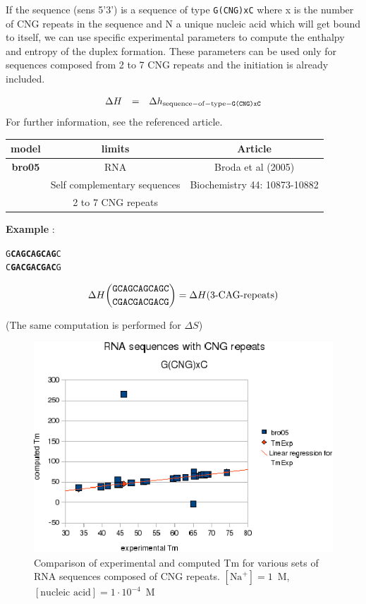 \documentclass{article}
\begin{document}
If the sequence (sens 5'3') is a sequence of type \texttt{G(CNG)xC} where x is the number of CNG repeats in
the sequence and N a unique nucleic acid which will get bound to itself, we can use specific
experimental parameters to compute the enthalpy and entropy of the duplex formation. These parameters can be used
only for sequences composed from 2 to 7 CNG repeats and the initiation is already included.
 
\begin{displaymath}
  \begin{array}[t]{ccc}
  \Delta{}H&=&\Delta{}h_\mathrm{sequence-of-type-\texttt{G(CNG)xC}}\\
  \end{array}
\end{displaymath}
For further information, see the referenced article.

\begin{table}[hc]
\begin{tabular}[h]{| c | c | c |}
\textbf{model} & \textbf{limits} & \textbf{Article} \\
 \hline
\textbf{bro05} & RNA & Broda et al (2005) \\
 & Self complementary sequences & Biochemistry 44: 10873-10882\\
 & 2 to 7 CNG repeats & \\
 \hline
\end{tabular}
\end{table}


\textbf{Example} :
\begin{alltt}
G\textbf{CAGCAGCAG}C
C\textbf{GACGACGAC}G
\end{alltt}

\begin{multline*}
\Delta H {\mbox{\texttt{GCAGCAGCAGC}} \choose \mbox{\texttt{CGACGACGACG}}} = 
\Delta H {(\mbox{3-CAG-repeats})}
\end{multline*}

       (The same computation is performed for $\Delta S$)

\begin{figure}[h]
\includegraphics[width=1\linewidth]{images/CNG}
\caption{Comparison of experimental and computed Tm for various sets of
 RNA sequences composed of CNG repeats. $[\mbox{Na}^+] = 1$~M, $[\mbox{nucleic acid}] = 1\cdot{}10^{-4}$~M}
\end{figure}
\end{document}
